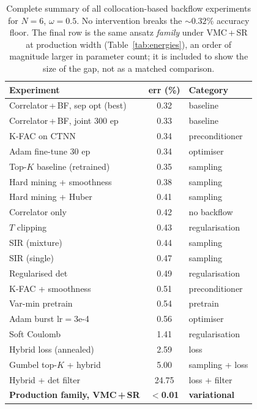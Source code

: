 \begin{table}[htbp]
\centering
\caption[All strong-form collocation interventions]{Complete summary of all collocation-based backflow experiments
for $N{=}6$, $\omega{=}0.5$.
No intervention breaks the ${\sim}0.32\%$ accuracy floor.
The final row is the same ansatz \emph{family} under VMC\,+\,SR at production width
(Table~\ref{tab:energies}), an order of magnitude larger in parameter count; it is included
to show the size of the gap, not as a matched comparison.}
\label{tab:c22:summary}
\begin{tabular}{l c l}
\toprule
Experiment & err (\%) & Category \\
\midrule
Correlator\,+\,BF, sep opt (best) & 0.32 & baseline \\
Correlator\,+\,BF, joint 300 ep & 0.33 & baseline \\
K-FAC on CTNN & 0.34 & preconditioner \\
Adam fine-tune 30 ep & 0.34 & optimiser \\
Top-$K$ baseline (retrained) & 0.35 & sampling \\
Hard mining + smoothness & 0.38 & sampling \\
Hard mining + Huber & 0.41 & sampling \\
Correlator only & 0.42 & no backflow \\
$T$ clipping & 0.43 & regularisation \\
SIR (mixture) & 0.44 & sampling \\
SIR (single) & 0.47 & sampling \\
Regularised det & 0.49 & regularisation \\
K-FAC + smoothness & 0.51 & preconditioner \\
Var-min pretrain & 0.54 & pretrain \\
Adam burst lr$=$3e-4 & 0.56 & optimiser \\
Soft Coulomb & 1.41 & regularisation \\
Hybrid loss (annealed) & 2.59 & loss \\
Gumbel top-$K$ + hybrid & 5.00 & sampling + loss \\
Hybrid + det filter & 24.75 & loss + filter \\
\midrule
\textbf{Production family, VMC\,+\,SR} & $<$\textbf{0.01} &
  \textbf{variational} \\
\bottomrule
\end{tabular}
\end{table}

